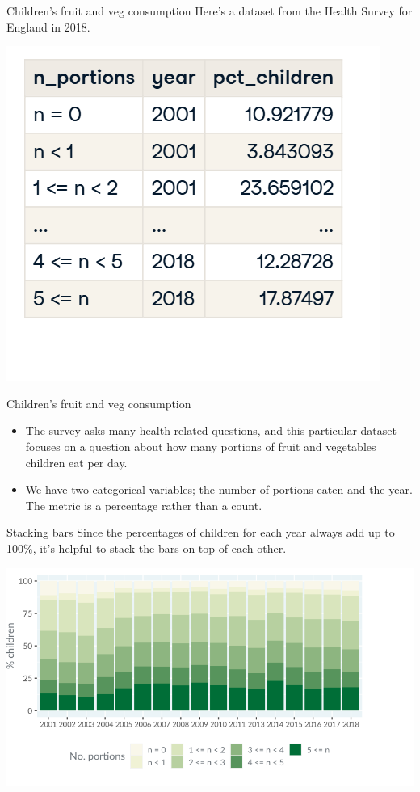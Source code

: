 \documentclass[
  ignorenonframetext,
]{beamer}
\begin{document}
\begin{frame}{Children's fruit and veg consumption}
\label{childrens-fruit-and-veg-consumption}
Here's a dataset from the Health Survey for England in 2018.

\includegraphics{../images/im53.png}
\end{frame}

\begin{frame}{Children's fruit and veg consumption}
\label{childrens-fruit-and-veg-consumption-1}
\begin{itemize}
\item
  The survey asks many health-related questions, and this particular
  dataset focuses on a question about how many portions of fruit and
  vegetables children eat per day.
\item
  We have two categorical variables; the number of portions eaten and
  the year. The metric is a percentage rather than a count.
\end{itemize}
\end{frame}

\begin{frame}{Stacking bars}
\label{stacking-bars}
Since the percentages of children for each year always add up to 100\%,
it's helpful to stack the bars on top of each other.

\includegraphics{../images/im54.png}
\end{frame}
\end{document}
